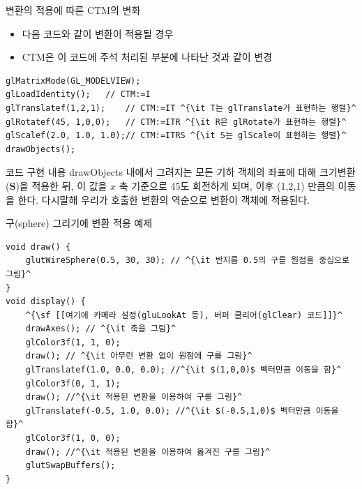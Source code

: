\documentclass{beamer}
\begin{document}
\begin{frame}[fragile]{변환의 적용에 따른 CTM의 변화}

\begin{itemize}
\item 다음 코드와 같이 변환이 적용될 경우
\item CTM은 이 코드에 주석 처리된 부분에 나타난 것과 같이 변경
\end{itemize}

\lstset{language=C++, basicstyle=\small, escapechar=^} 
\begin{lstlisting}
glMatrixMode(GL_MODELVIEW);
glLoadIdentity();	// CTM:=I
glTranslatef(1,2,1);	// CTM:=IT ^{\it T는 glTranslate가 표현하는 행렬}^
glRotatef(45, 1,0,0);	// CTM:=ITR ^{\it R은 glRotate가 표현하는 행렬}^
glScalef(2.0, 1.0, 1.0);// CTM:=ITRS ^{\it S는 glScale이 표현하는 행렬}^
drawObjects();
\end{lstlisting}

\begin{block}{코드 구현 내용}
drawObjects 내에서 그려지는 모든 기하 객체의 좌표에 대해 크기변환($\mathbf S$)을 적용한 뒤, 이 값을 $x$ 축 기준으로 45도 회전하게 되며, 
이후 (1,2,1) 만큼의 이동을 한다. 다시말해 우리가 호출한 변환의 역순으로 변환이 객체에 적용된다.
\end{block}

\end{frame}

\begin{frame}[fragile]{구(sphere) 그리기에 변환 적용 예제}

\lstset{language=C++, escapechar=^} 
\begin{lstlisting}
void draw() {
    glutWireSphere(0.5, 30, 30); // ^{\it 반지름 0.5의 구를 원점을 중심으로 그림}^
}
void display() {
    ^{\sf [[여기에 카메라 설정(gluLookAt 등), 버퍼 클리어(glClear) 코드]]}^
    drawAxes(); // ^{\it 축을 그림}^
    glColor3f(1, 1, 0);
    draw(); // ^{\it 아무런 변환 없이 원점에 구를 그림}^
    glTranslatef(1.0, 0.0, 0.0); //^{\it $(1,0,0)$ 벡터만큼 이동을 함}^
    glColor3f(0, 1, 1);
    draw(); //^{\it 적용된 변환을 이용하여 구를 그림}^
    glTranslatef(-0.5, 1.0, 0.0); //^{\it $(-0.5,1,0)$ 벡터만큼 이동을 함}^
    glColor3f(1, 0, 0);
    draw(); //^{\it 적용된 변환을 이용하여 옮겨진 구를 그림}^
    glutSwapBuffers();
}
\end{lstlisting}

\end{frame}
\end{document}

